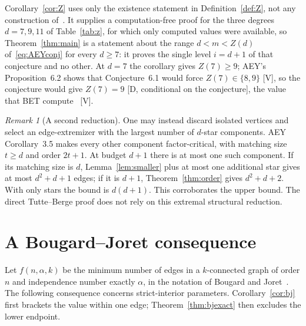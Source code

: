 \documentclass[11pt]{article}
\theoremstyle{remark}
\newtheorem{remark}[theorem]{Remark}
\begin{document}
Corollary~\ref{cor:Z} uses only the existence statement in Definition~\ref{def:Z}, not any construction of~\cite{AEY}. It supplies a computation-free proof for the three degrees $d=7,9,11$ of Table~\ref{tab:z}, for which only computed values were available, so Theorem~\ref{thm:main} is a statement about the range $d<m<Z(d)$ of~\eqref{eq:AEYconj} for every $d\ge7$: it proves the single level $i=d+1$ of that conjecture and no other. At $d=7$ the corollary gives $Z(7)\ge9$; AEY's Proposition~6.2 shows that Conjecture~6.1 would force $Z(7)\in\{8,9\}$ [V], so the conjecture would give $Z(7)=9$ [D, conditional on the conjecture], the value that BET compute~\cite{BET} [V].

\begin{remark}[A second reduction]
One may instead discard isolated vertices and select an edge-extremizer with the largest number of $d$-star components. AEY Corollary~3.5 makes every other component factor-critical, with matching size $t\ge d$ and order $2t+1$. At budget $d+1$ there is at most one such component. If its matching size is $d$, Lemma~\ref{lem:smaller} plus at most one additional star gives at most $d^2+d+1$ edges; if it is $d+1$, Theorem~\ref{thm:order} gives $d^2+d+2$. With only stars the bound is $d(d+1)$. This corroborates the upper bound. The direct Tutte--Berge proof does not rely on this extremal structural reduction.
\end{remark}

\section{A Bougard--Joret consequence}\label{sec:bj}

Let $f(n,\alpha,k)$ be the minimum number of edges in a $k$-connected graph of order $n$ and independence number exactly $\alpha$, in the notation of Bougard and Joret~\cite{BJ}. The following consequence concerns strict-interior parameters. Corollary~\ref{cor:bj} first brackets the value within one edge; Theorem~\ref{thm:bjexact} then excludes the lower endpoint.
\end{document}
